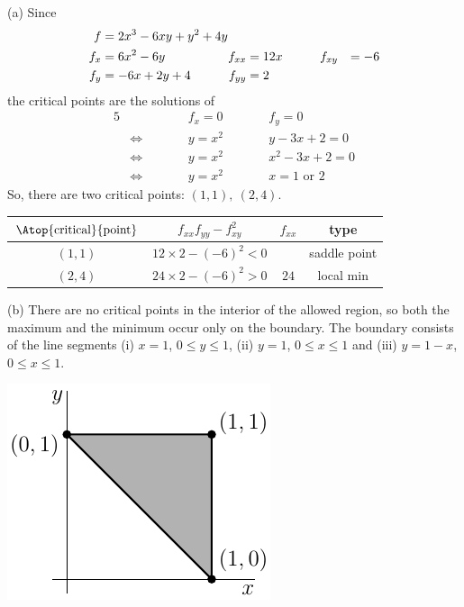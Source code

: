\begin{solution}
 (a) Since
\begin{alignat*}{5}
f&=2x^3 - 6xy + y^2 +4y \hidewidth \\
f_x&=6x^2-6y & f_{xx}&=12x\qquad && f_{xy}&= -6\\
f_y&=-6x+2y+4\qquad & f_{yy}&=2
\end{alignat*}
the critical points are the solutions of
\begin{alignat*}{5}
& & &f_x=0\qquad & &f_y=0 \\
&\iff\qquad& &y=x^2\qquad & &y-3x+2=0 \\
&\iff& &y=x^2 & &x^2-3x+2=0 \\
&\iff& &y=x^2 & &x=1\text{ or }2 
\end{alignat*}
So, there are two critical points: $(1,1),\ (2,4)$.
\begin{center}
\renewcommand{\arraystretch}{1.3}
     \begin{tabular}{|c|c|c|c|}
     \hline
    $\Atop{\text{critical}}{\text{point}}$  & $f_{xx}f_{yy}-f_{xy}^2$ & 
                                                          $f_{xx}$ & type \\    
    \hline
     $(1,1)$  & $12\times 2-(-6)^2<0$ &    & saddle point \\ \hline
     $(2,4)$  & $24\times 2-(-6)^2>0$ & $24$ & local min \\  \hline
     \end{tabular}
\renewcommand{\arraystretch}{1.0}
\end{center}

(b)
There are no critical points in the interior of the allowed region,
so both the maximum and the minimum occur only on the boundary. The boundary
consists of the line segments (i) $x=1$, $0\le y\le 1$, (ii) $y=1$, $0\le
x\le 1$ and (iii) $y=1-x$, $0\le x\le 1$.

\begin{center}
     \includegraphics{fig/OE04Q4.pdf}
\end{center}


\end{solution}
